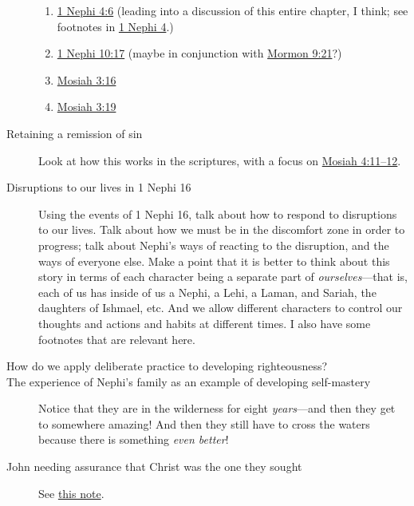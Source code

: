 \begin{description}
			\begin{enumerate}
				\item \hyperref[1NEPHI-4-6]{1 Nephi 4:6} (leading into a discussion of this entire chapter, I think; see footnotes in \hyperref[1NEPHI-4]{1 Nephi 4}.)
				\item \hyperref[1NEPHI-10-17]{1 Nephi 10:17} (maybe in conjunction with \hyperref[MORMON-9-21]{Mormon 9:21}?)
				\item \hyperref[MOSIAH-3-16]{Mosiah 3:16}
				\item \hyperref[MOSIAH-3-19]{Mosiah 3:19}
			\end{enumerate}
			
		\item[Retaining a remission of sin]
			Look at how this works in the scriptures, with a focus on \hyperref[MOSIAH-4-11]{Mosiah 4:11--12}.
			
		\item[Disruptions to our lives in 1 Nephi 16]
			Using the events of 1 Nephi 16, talk about how to respond to disruptions to our lives. Talk about how we must be in the discomfort zone in order to progress; talk about Nephi's ways of reacting to the disruption, and the ways of everyone else. Make a point that it is better to think about this story in terms of each character being a separate part of \textit{ourselves}---that is, each of us has inside of us a Nephi, a Lehi, a Laman, and Sariah, the daughters of Ishmael, etc. And we allow different characters to control our thoughts and actions and habits at different times. I also have some footnotes that are relevant here.
			
		\item[How do we apply deliberate practice to developing righteousness?]
		
		\item[The experience of Nephi's family as an example of developing self-mastery]
			Notice that they are in the wilderness for eight \textit{years}---and then they get to somewhere amazing! And then they still have to cross the waters because there is something \textit{even better}!
			
		\item[John needing assurance that Christ was the one they sought]
			See \hyperref[LCHRIST-088-su]{this note}.
			

\end{description}
